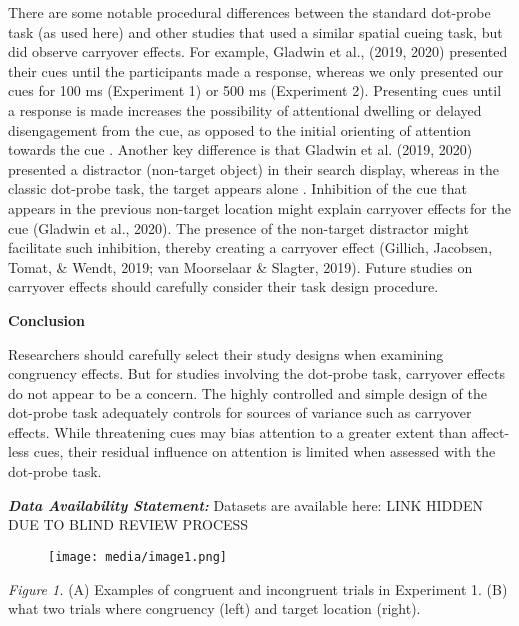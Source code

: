 \documentclass{article}
\begin{document}
There are some notable procedural differences between the standard dot-probe task (as used here) and other studies that used a similar spatial cueing task, but did observe carryover effects. For example, Gladwin et al., (2019, 2020) presented their cues until the participants made a response, whereas we only presented our cues for 100 ms (Experiment 1) or 500 ms (Experiment 2). Presenting cues until a response is made increases the possibility of attentional dwelling or delayed disengagement from the cue, as opposed to the initial orienting of attention towards the cue \parencite{Fox2001}. Another key difference is that Gladwin et al. (2019, 2020) presented a distractor (non-target object) in their search display, whereas in the classic dot-probe task, the target appears alone \parencite{Mogg1998}. Inhibition of the cue that appears in the previous non-target location might explain carryover effects for the cue (Gladwin et al., 2020). The presence of the non-target distractor might facilitate such inhibition, thereby creating a carryover effect (Gillich, Jacobsen, Tomat, \& Wendt, 2019; van Moorselaar \& Slagter, 2019). Future studies on carryover effects should carefully consider their task design procedure. 

\textbf{Conclusion}

Researchers should carefully select their study designs when examining congruency effects. But for studies involving the dot-probe task, carryover effects do not appear to be a concern. The highly controlled and simple design of the dot-probe task adequately controls for sources of variance such as carryover effects. While threatening cues may bias attention to a greater extent than affect-less cues, their residual influence on attention is limited when assessed with the dot-probe task. 

\emph{\textbf{Data Availability Statement:}}\emph{ }Datasets are available here: LINK HIDDEN DUE TO BLIND REVIEW PROCESS 




\begin{figure}

  \texttt{[image: media/image1.png]}
\caption{}
\label{}


\end{figure}


\emph{Figure 1. }(A) Examples of congruent and incongruent trials in Experiment 1. (B) what two trials where congruency (left) and target location (right). 
\end{document}
